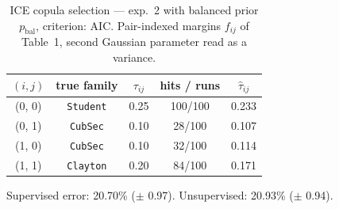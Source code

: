 \begin{table}[htbp]
  \centering
  \caption{ICE copula selection — exp.\ 2 with balanced prior $p_{\text{bal}}$, criterion: AIC. Pair-indexed margins $f_{ij}$ of Table~1, second Gaussian parameter read as a variance.}
  \label{tab:exp3-exp2_bal_p__aic}
  \begin{tabular}{ccccc}
    \toprule
    $(i, j)$ & true family & $\tau_{ij}$ & hits / runs & $\hat\tau_{ij}$ \\
    \midrule
    (0, 0) & \texttt{Student} & 0.25 & 100/100 & 0.233 \\
    (0, 1) & \texttt{CubSec} & 0.10 & 28/100 & 0.107 \\
    (1, 0) & \texttt{CubSec} & 0.10 & 32/100 & 0.114 \\
    (1, 1) & \texttt{Clayton} & 0.20 & 84/100 & 0.171 \\
    \bottomrule
  \end{tabular}
  \par\smallskip Supervised error: 20.70\% ($\pm$ 0.97). Unsupervised: 20.93\% ($\pm$ 0.94).
\end{table}
